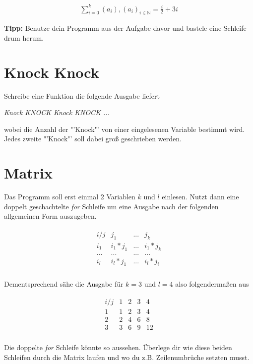 \documentclass[c_worksheet.tex]{subfiles}
\begin{document}
\begin{align*}
 	\sum_{i=0}^k (a_i),    (a_i)_{i \in \mathbb{N} } = \frac{i}{2} + 3i 
 \end{align*} 

\textbf{Tipp: } Benutze dein Programm aus der Aufgabe davor und bastele eine Schleife drum herum.


\section{Knock Knock}

Schreibe eine Funktion die folgende Ausgabe liefert

\begin{center}
\textit{Knock KNOCK Knock KNOCK ... }
\end{center}

wobei die Anzahl der "'Knock"' von einer eingelesenen Variable bestimmt wird. Jedes zweite "'Knock"' soll dabei groß geschrieben werden.  


\section{Matrix}

Das Programm soll erst einmal 2 Variablen \(k\) und \(l\) einlesen. Nutzt dann eine doppelt geschachtelte \emph{for} Schleife um eine Ausgabe nach der folgenden allgemeinen Form auszugeben.

\begin{align*}
\begin{matrix}
i / j  & j_1     & ... & j_k       \\
i_1    & i_1*j_1 & ... & i_1 * j_k \\
...    & ...     & ... & ...       \\
i_l    & i_l*j_1 & ... & i_l*j_i   \\
\end{matrix}
\end{align*}

Dementsprechend sähe die Ausgabe für \(k=3\) und \(l=4\) also folgendermaßen aus

\begin{align*}
\begin{matrix}
i / j & 1 & 2 & 3 &  4 \\
    1 & 1 & 2 & 3 &  4 \\
    2 & 2 & 4 & 6 &  8 \\
    3 & 3 & 6 & 9 & 12 \\
\end{matrix}
\end{align*}

Die doppelte \emph{for} Schleife könnte so aussehen. Überlege dir wie diese beiden Schleifen durch die Matrix laufen und wo du z.B. Zeilenumbrüche setzten musst.

 
\end{document}

